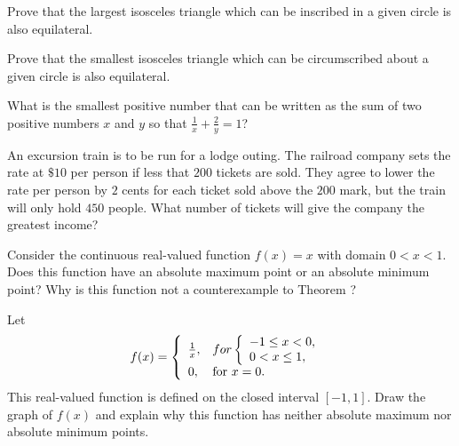 \begin{exercises}
Prove that the largest isosceles triangle which can be inscribed
in a given circle is also equilateral.

Prove that the smallest isosceles triangle which can be circumscribed
about a given circle is also equilateral.

What is the smallest positive number that can be written as the sum of
two positive numbers $x$ and $y$ so that $\frac1x + \frac2y = 1$?

An excursion train is to be run for a lodge outing.  The railroad company
sets the rate at $\$10$ per person if less that $200$ tickets are sold.
They agree to lower the rate per person by $2$ cents for each ticket
sold above the $200$ mark, but the train will only hold $450$ people.
What number of tickets will give the company the greatest income?

Consider the continuous real-valued function $f(x) = x$ with domain
$0 < x < 1$.  Does this function have an absolute maximum point
or an absolute minimum point?
Why is this function not a counterexample to Theorem ?

Let
\[
f(x) = \left\{ \begin{array}{ll} \frac1x, & for\left\{ \begin{array}{ll} -1 \leq x < 0, \\ 0 < x \leq 1, \end{array} \right. \\ 0, & \mbox{for $x = 0$}. \end{array} \right.
\]
This real-valued function is defined on the closed interval $[-1,1]$.
Draw the graph of $f(x)$ and explain why this function has neither
absolute maximum nor absolute minimum points.

\end{exercises}
